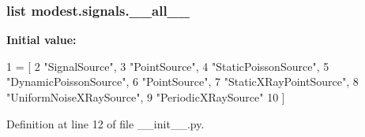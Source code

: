\subsubsection[{\texorpdfstring{\+\_\+\+\_\+all\+\_\+\+\_\+}{__all__}}]{\setlength{\rightskip}{0pt plus 5cm}list modest.\+signals.\+\_\+\+\_\+all\+\_\+\+\_\+\hspace{0.3cm}{\ttfamily [private]}}\hypertarget{namespacemodest_1_1signals_aa31151680eba696b8f6eb7877a67adac}{}\label{namespacemodest_1_1signals_aa31151680eba696b8f6eb7877a67adac}
{\bfseries Initial value\+:}
\begin{DoxyCode}
1 = [
2     \textcolor{stringliteral}{"SignalSource"},
3     \textcolor{stringliteral}{"PointSource"},
4     \textcolor{stringliteral}{"StaticPoissonSource"},
5     \textcolor{stringliteral}{"DynamicPoissonSource"},
6     \textcolor{stringliteral}{"PointSource"},
7     \textcolor{stringliteral}{"StaticXRayPointSource"},
8     \textcolor{stringliteral}{"UniformNoiseXRaySource"},
9     \textcolor{stringliteral}{"PeriodicXRaySource"}
10 ]
\end{DoxyCode}


Definition at line 12 of file \+\_\+\+\_\+init\+\_\+\+\_\+.\+py.

